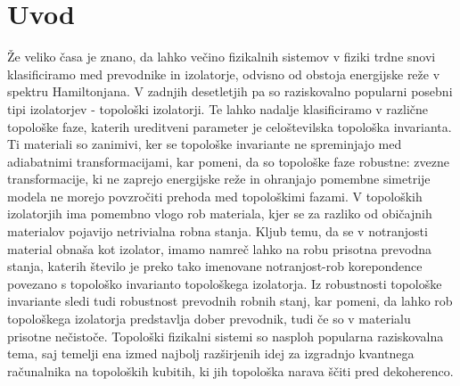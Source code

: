 
\cleardoublepage
\tableofcontents


\pagestyle{fancy}
\fancyhead[CE,RE]{}
\fancyhead[LO,CO]{}
\fancyhead[LE]{\textbf{\nouppercase{\leftmark}}}
\fancyhead[RO]{\textbf{\nouppercase{\rightmark}}}

%

\chapter{Uvod}
\label{chUv}
Že veliko časa je znano, da lahko večino fizikalnih sistemov v fiziki trdne snovi klasificiramo med prevodnike in izolatorje, odvisno od obstoja energijske reže v spektru Hamiltonjana. V zadnjih desetletjih pa so raziskovalno popularni posebni tipi izolatorjev - topološki izolatorji. Te lahko nadalje klasificiramo v različne topološke faze, katerih ureditveni parameter je celoštevilska topološka invarianta. Ti materiali so zanimivi, ker se topološke invariante ne spreminjajo med adiabatnimi transformacijami, kar pomeni, da so topološke faze robustne: zvezne transformacije, ki ne zaprejo energijske reže in ohranjajo pomembne simetrije modela ne morejo povzročiti prehoda med topološkimi fazami. V topoloških izolatorjih ima pomembno vlogo rob materiala, kjer se za razliko od običajnih materialov pojavijo netrivialna robna stanja. Kljub temu, da se v notranjosti material obnaša kot izolator, imamo namreč lahko na robu prisotna prevodna stanja, katerih število je preko tako imenovane notranjost-rob korepondence povezano s topološko invarianto topološkega izolatorja. Iz robustnosti topološke invariante sledi tudi robustnost prevodnih robnih stanj, kar pomeni, da lahko rob topološkega izolatorja predstavlja dober prevodnik, tudi če so v materialu prisotne nečistoče. Topološki fizikalni sistemi so nasploh popularna raziskovalna tema, saj temelji ena izmed najbolj razširjenih idej za izgradnjo kvantnega računalnika na topoloških kubitih, ki jih topološka narava ščiti pred dekoherenco.

